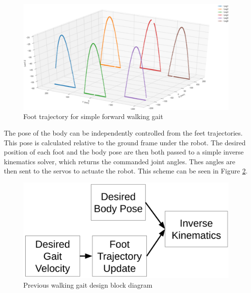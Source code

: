 \begin{figure}[H]
    \centerline{\includegraphics[scale=0.1]{./03_related_work/figures/old_trajectory.png}}
    \caption{Foot trajectory for simple forward walking gait}
    \label{fig:old_gait}
\end{figure}

The pose of the body can be independently controlled from the feet trajectories. This pose is calculated relative to the ground frame under the robot. The desired position of each foot and the body pose are then both passed to a simple inverse kinematics solver, which returns the commanded joint angles. Thes angles are then sent to the servos to actuate the robot. This scheme can be seen in Figure \ref{fig:old_gait_block_diagram}.

\begin{figure}[H]
    \centerline{\includegraphics[scale=0.1]{./03_related_work/figures/previous_kinematic_chain.png}}
    \caption{Previous walking gait design block diagram}
    \label{fig:old_gait_block_diagram}
\end{figure}
